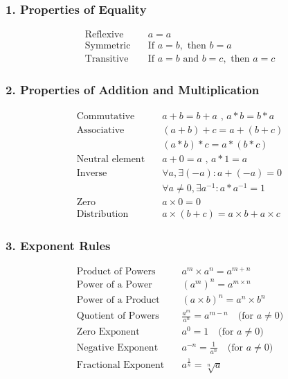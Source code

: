 \documentclass[twocolumn,a4]{article}
\begin{document}
\subsubsection*{1. Properties of Equality}
\begin{align*}
\text{Reflexive} \quad & a = a \\
\text{Symmetric} \quad & \text{If } a = b, \text{ then } b = a \\
\text{Transitive} \quad & \text{If } a = b \text{ and } b = c, \text{ then } a = c
\end{align*}

\subsubsection*{2. Properties of Addition and Multiplication}
\begin{align*}
\text{Commutative} \quad & a + b = b + a \text{ , } a * b = b * a \\
\text{Associative} \quad & (a + b) + c = a + (b + c) \\
\quad & (a * b) * c = a * (b * c) \\
\text{Neutral element} \quad & a + 0 = a \text{ , } a * 1 = a \\
\text{Inverse} \quad & \forall a , \exists (-a) : a + (-a) = 0 \\
\quad & \forall a \neq 0 , \exists a^{-1} : a * a^{-1} = 1 \\
\text{Zero} \quad & a \times 0 = 0 \\
\text{Distribution} \quad & a \times (b + c) = a \times b + a \times c
\end{align*}

\subsubsection*{3. Exponent Rules}
\begin{align*}
\text{Product of Powers} \quad & a^m \times a^n = a^{m+n} \\
\text{Power of a Power} \quad & (a^m)^n = a^{m \times n} \\
\text{Power of a Product} \quad & (a \times b)^n = a^n \times b^n \\
\text{Quotient of Powers} \quad & \frac{a^m}{a^n} = a^{m-n} \quad \text{(for } a \neq 0\text{)} \\
\text{Zero Exponent} \quad & a^0 = 1 \quad \text{(for } a \neq 0\text{)} \\
\text{Negative Exponent} \quad & a^{-n} = \frac{1}{a^n} \quad \text{(for } a \neq 0\text{)} \\
\text{Fractional Exponent} \quad & a^{\frac{1}{n}} = \sqrt[n]{a}
\end{align*}
\end{document}
